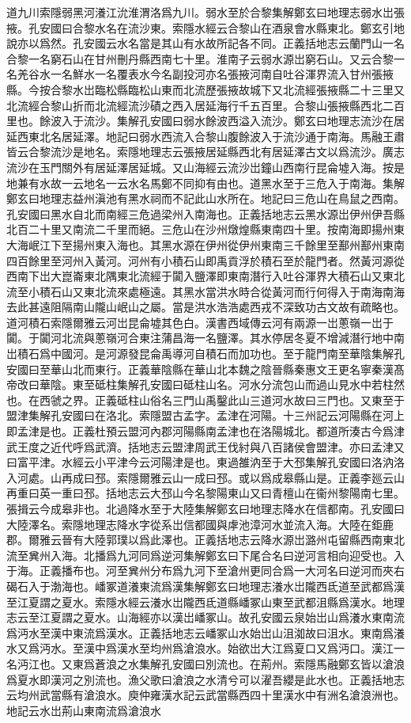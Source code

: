 道九川索隱弱黑河瀁江沇淮渭洛爲九川。弱水至於合黎集解鄭玄曰地理志弱水岀張掖。孔安國曰合黎水名在流沙東。索隱水經云合黎山在酒泉會水縣東北。鄭玄引地說亦以爲然。孔安國云水名當是其山有水故所記各不同。正義括地志云蘭門山一名合黎一名窮石山在甘州刪丹縣西南七十里。淮南子云弱水源岀窮石山。又云合黎一名羌谷水一名鮮水一名覆表水今名副投河亦名張掖河南自吐谷渾界流入甘州張掖縣。今按合黎水岀臨松縣臨松山東而北流歷張掖故城下又北流經張掖縣二十三里又北流經合黎山折而北流經流沙磧之西入居延海行千五百里。合黎山張掖縣西北二百里也。餘波入于流沙。集解孔安國曰弱水餘波西溢入流沙。鄭玄曰地理志流沙在居延西東北名居延澤。地記曰弱水西流入合黎山腹餘波入于流沙通于南海。馬融王肅皆云合黎流沙是地名。索隱地理志云張掖居延縣西北有居延澤古文以爲流沙。廣志流沙在玉門關外有居延澤居延城。又山海經云流沙岀鐘山西南行昆侖墟入海。按是地兼有水故一云地名一云水名馬鄭不同抑有由也。道黑水至于三危入于南海。集解鄭玄曰地理志益州滇池有黑水祠而不記此山水所在。地記曰三危山在鳥鼠之西南。孔安國曰黑水自北而南經三危過梁州入南海也。正義括地志云黑水源岀伊州伊吾縣北百二十里又南流二千里而絕。三危山在沙州燉煌縣東南四十里。按南海即揚州東大海岷江下至揚州東入海也。其黑水源在伊州從伊州東南三千餘里至鄯州鄯州東南四百餘里至河州入黃河。河州有小積石山即禹貢浮於積石至於龍門者。然黃河源從西南下岀大崑崙東北隅東北流經于闐入鹽澤即東南潛行入吐谷渾界大積石山又東北流至小積石山又東北流來處極遠。其黑水當洪水時合從黃河而行何得入于南海南海去此甚遠阻隔南山隴山岷山之屬。當是洪水浩浩處西戎不深致功古文故有疏略也。道河積石索隱爾雅云河岀昆侖墟其色白。漢書西域傳云河有兩源一岀蔥嶺一岀于闐。于闐河北流與蔥嶺河合東注蒲昌海一名鹽澤。其水停居冬夏不增減潛行地中南岀積石爲中國河。是河源發昆侖禹導河自積石而加功也。至于龍門南至華陰集解孔安國曰至華山北而東行。正義華陰縣在華山北本魏之陰晉縣秦惠文王更名寧秦漢髙帝改曰華陰。東至砥柱集解孔安國曰砥柱山名。河水分流包山而過山見水中若柱然也。在西虢之界。正義砥柱山俗名三門山禹鑿此山三道河水故曰三門也。又東至于盟津集解孔安國曰在洛北。索隱盟古孟字。孟津在河陽。十三州記云河陽縣在河上即孟津是也。正義杜預云盟河內郡河陽縣南孟津也在洛陽城北。都道所湊古今爲津武王度之近代呼爲武濟。括地志云盟津周武王伐紂與八百諸侯會盟津。亦曰孟津又曰富平津。水經云小平津今云河陽津是也。東過雒汭至于大邳集解孔安國曰洛汭洛入河處。山再成曰邳。索隱爾雅云山一成曰邳。或以爲成皋縣山是。正義李廵云山再重曰英一重曰邳。括地志云大邳山今名黎陽東山又曰青檀山在衞州黎陽南七里。張揖云今成皋非也。北過降水至于大陸集解鄭玄曰地理志降水在信都南。孔安國曰大陸澤名。索隱地理志降水字從系岀信都國與虖池漳河水並流入海。大陸在鉅鹿郡。爾雅云晉有大陸郭璞以爲此澤也。正義括地志云降水源岀潞州屯留縣西南東北流至兾州入海。北播爲九河同爲逆河集解鄭玄曰下尾合名曰逆河言相向迎受也。入于海。正義播布也。河至兾州分布爲九河下至滄州更同合爲一大河名曰逆河而夾右碣石入于渤海也。嶓冢道瀁東流爲漢集解鄭玄曰地理志瀁水岀隴西氐道至武都爲漢至江夏謂之夏水。索隱水經云瀁水岀隴西氐道縣嶓冢山東至武都沮縣爲漢水。地理志云至江夏謂之夏水。山海經亦以漢岀嶓冢山。故孔安國云泉始岀山爲瀁水東南流爲沔水至漢中東流爲漢水。正義括地志云嶓冢山水始岀山沮洳故曰沮水。東南爲瀁水又爲沔水。至漢中爲漢水至均州爲滄浪水。始欲岀大江爲夏口又爲沔口。漢江一名沔江也。又東爲蒼浪之水集解孔安國曰別流也。在荊州。索隱馬融鄭玄皆以滄浪爲夏水即漢河之別流也。漁父歌曰滄浪之水清兮可以濯吾纓是此水也。正義括地志云均州武當縣有滄浪水。庾仲雍漢水記云武當縣西四十里漢水中有洲名滄浪洲也。地記云水岀荊山東南流爲滄浪水